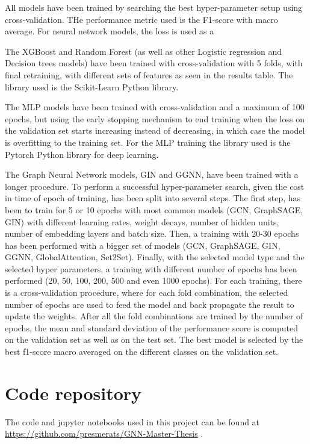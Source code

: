 \begin{appendices}
All models have been trained by searching the best hyper-parameter setup using cross-validation. THe performance metric used is the F1-score with macro average. For neural network models, the loss is used as a 

The XGBoost and Random Forest (as well as other Logistic regression and Decision trees models) have been trained with cross-validation with 5 folds, with final retraining, with different sets of features as seen in the results table.  The library used is the Scikit-Learn Python library.

The MLP models have been trained with cross-validation and a maximum of 100 epochs, but using the early stopping mechanism to end training when the loss on the validation set starts increasing instead of decreasing, in which case the model is overfitting to the training set. For the MLP training the library used is the Pytorch Python library for deep learning.

The Graph Neural Network models, GIN and GGNN, have been trained with a longer procedure. To perform a successful hyper-parameter search, given the cost in time of epoch of training, has been split into several steps. The first step, has been to train for 5 or 10 epochs with most common models (GCN, GraphSAGE, GIN) with different learning rates, weight decays, number of hidden units, number of embedding  layers and batch size. Then, a training with 20-30 epochs has been performed with a bigger set of models (GCN, GraphSAGE, GIN, GGNN, GlobalAttention, Set2Set). Finally, with the selected model type and the selected hyper parameters, a training with different number of epochs has been performed (20, 50, 100, 200, 500 and even 1000 epochs). For each training, there is a cross-validation procedure, where for each fold combination, the selected number of epochs are used to feed the model and back propagate the result to update the weights. After all the fold combinations are trained by the number of epochs, the mean and standard deviation of the performance score is computed on the validation set as well as on the test set. The best model is selected by the best f1-score macro averaged on the different classes on the validation set.







\section{Code repository}\label{annex:github}

The code and jupyter notebooks used in this project can be found at \href{https://github.com/presmerats/GNN-Master-Thesis}{https://github.com/presmerats/GNN-Master-Thesis} .


\end{appendices} 